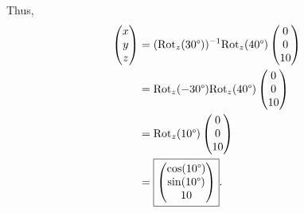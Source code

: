 \documentclass[12pt]{article}
\begin{document}
Thus,
\begin{align*}
	\begin{pmatrix} x \\ y \\ z \end{pmatrix}
	&=
	(\text{Rot}_z(30 \degree))^{-1}
	\text{Rot}_z(40 \degree)
	\begin{pmatrix} 0 \\ 0 \\ 10 \end{pmatrix} \\
	&=
	\text{Rot}_z(-30 \degree)
	\text{Rot}_z(40 \degree)
	\begin{pmatrix} 0 \\ 0 \\ 10 \end{pmatrix} \\
	&=
	\text{Rot}_z(10 \degree)
	\begin{pmatrix} 0 \\ 0 \\ 10 \end{pmatrix} \\
	&=
	\boxed{
		\begin{pmatrix}
			\cos(10 \degree) \\
			\sin(10 \degree) \\
			10
		\end{pmatrix}
	}
	.
\end{align*}
\end{document}
